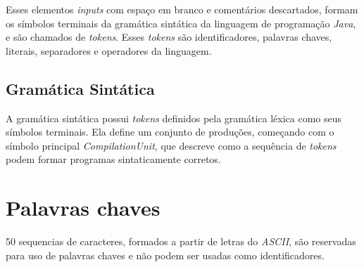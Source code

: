 \documentclass[conference]{IEEEtran}
\begin{document}
Esses elementos \textit{inputs} com espaço em branco e comentários descartados, formam os símbolos terminais da gramática sintática da linguagem de programação \textit{Java}, e são chamados de \textit{tokens}. Esses \textit{tokens} são identificadores, palavras chaves, literais, separadores e operadores da linguagem.

\subsection{Gramática Sintática}\label{AA}
A gramática sintática possui \textit{tokens} definidos pela gramática léxica como seus símbolos terminais. Ela define um conjunto de produções, começando com o símbolo principal \textit{CompilationUnit}, que descreve como a sequência de \textit{tokens} podem formar programas sintaticamente corretos.

\begin{comment}
Gramática Léxica

A gramática de Java tem como seus símbolos terminais os caracteres da codificação de caracteres Unicode. Ela define um conjunto de produções, começando do símbolo principal Input, que descreve como sequencias de caracteres Unicode são traduzidos em uma sequência de elementos input.
Esses elementos inputs com espaço em branco e comentários descartados, formam os símbolos terminais da gramática sintática da linguagem de programação Java, e são chamados de tokens. Esses tokens são identificadores, palavras chaves, literais, separadores e operadores da linguagem.
Gramática Sintática

A gramática sintática possui tokens definidos pela gramática léxica como seus símbolos terminais. Ela define um conjunto de produções, começando com o símbolo principal CompilationUnit, que descreve como a sequência de tokens podem formar programas sintaticamente corretos.

\end{comment}

\section{Palavras chaves}

50 sequencias de caracteres, formados a partir de letras do \textit{ASCII}, são reservadas para uso de palavras chaves e não podem ser usadas como identificadores.
\end{document}
